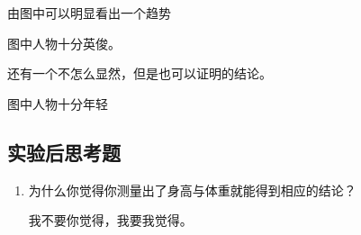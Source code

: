 \documentclass[no-math,zihao = -4]{ctexart} %
\begin{document}
        由图中可以明显看出一个趋势
        \begin{conc}
            图中人物十分英俊。
        \end{conc}

        还有一个不怎么显然，但是也可以证明的结论。
        \begin{conc}
            图中人物十分年轻
        \end{conc}

        \newpage
        \subsection{实验后思考题}
            \begin{enumerate}
                \item 为什么你觉得你测量出了身高与体重就能得到相应的结论？
                    \begin{ans}
                        我不要你觉得，我要我觉得。
                    \end{ans}
            \end{enumerate}
\end{document}

